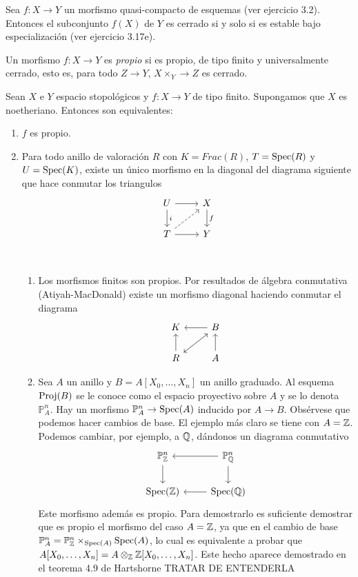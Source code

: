 \documentclass[GA.tex]{subfiles}
\begin{document}
\begin{lemma}
Sea $f:X\to Y$ un morfismo quasi-compacto de esquemas (ver ejercicio 3.2). Entonces el subconjunto $f(X)$ de $Y$ es cerrado si y solo si es estable bajo especialización (ver ejercicio 3.17e). 
\end{lemma}


\begin{defi}
Un morfismo $f:X\to Y$ es \emph{propio} si es propio, de tipo finito y universalmente cerrado, esto es, para todo $Z\to Y$, $X\times_Y\to Z$ es cerrado.
\end{defi}

\begin{prop}
Sean $X$ e $Y$ espacio stopológicos y $f:X\to Y$ de tipo finito. Supongamos que $X$ es noetheriano. Entonces son equivalentes:
\begin{enumerate}
\item $f$ es propio.
\item Para todo anillo de valoración $R$ con $K=Frac(R)$, $T=\operatorname{Spec}(R)$ y $U=\operatorname{Spec}(K)$, existe un único morfismo en la diagonal del diagrama siguiente que hace conmutar los triangulos
\[
\begin{tikzcd}
U\arrow[r] \arrow[d, "i"]& X\arrow[d, "f"]\\
T\arrow[r]\arrow[ur, dashed] & Y
\end{tikzcd}
\]

\begin{ej}\
\begin{enumerate}
\item Los morfismos finitos son propios. Por resultados de álgebra conmutativa (Atiyah-MacDonald) existe un morfismo diagonal haciendo conmutar el diagrama
\[
\begin{tikzcd}
K & B\arrow[l]\arrow[dl, dashed]\\
R\arrow[u]\arrow[ur, dashed] & A\arrow[u]
\end{tikzcd}
\]
\item Sea $A$ un anillo y $B=A[X_0,\dots, X_n]$ un anillo graduado. Al esquema $\operatorname{Proj}(B)$ se le conoce como el espacio proyectivo sobre $A$ y se lo denota $\mathbb{P}_A^n$. Hay un morfismo $\mathbb{P}_A^n\to\operatorname{Spec}(A)$ inducido por $A\to B$. Obsérvese que podemos hacer cambios de base. El ejemplo más claro se tiene con $A=\mathbb{Z}$. Podemos cambiar, por ejemplo, a $\mathbb{Q}$, dándonos un diagrama conmutativo
\[
\begin{tikzcd}
\PP_{\Z}^n\arrow[d] & \PP_\Q^n\arrow[l]\arrow[d]\\
\spec(\Z) & \spec(\Q)\arrow[l]
\end{tikzcd}
\]
Este morfismo además es propio. Para demostrarlo es suficiente demostrar que es propio el morfismo del caso $A=\mathbb{Z}$, ya que en el cambio de base $\mathbb{P}_A^n=\mathbb{P}_{\mathbb{Z}}^n\times_{\operatorname{Spec}(A)}\operatorname{Spec}(A)$, lo cual es equivalente a probar que $A[X_0,\dots, X_n]=A\otimes_{\mathbb{Z}} \mathbb{Z}[X_0,\dots,X_n]$. Este hecho aparece demostrado en el teorema 4.9 de Hartshorne TRATAR DE ENTENDERLA
\end{enumerate}
\end{ej}
\end{enumerate}
\end{prop}
\end{document}
